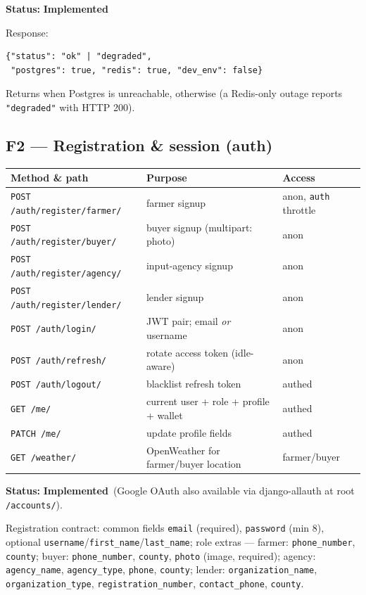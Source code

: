 \documentclass[11pt,a4paper]{article}
\newcommand{\done}{\textcolor{statusdone}{\textbf{Implemented}}}
\newcommand{\code}[1]{\texttt{\allowbreak #1\allowbreak}}
\begin{document}
\textbf{Status:} \done

Response:
\begin{verbatim}
{"status": "ok" | "degraded",
 "postgres": true, "redis": true, "dev_env": false}
\end{verbatim}
Returns \code{503} when Postgres is unreachable, \code{200} otherwise (a
Redis-only outage reports \code{"degraded"} with HTTP 200).

\subsection{F2 --- Registration \& session (auth)}
\begin{center}
\small
\begin{tabularx}{\textwidth}{@{} l X l @{}}
\toprule
\textbf{Method \& path} & \textbf{Purpose} & \textbf{Access} \\
\midrule
\code{POST /auth/register/farmer/}    & farmer signup  & anon, \code{auth} throttle \\
\code{POST /auth/register/buyer/}     & buyer signup (multipart: photo) & anon \\
\code{POST /auth/register/agency/}    & input-agency signup & anon \\
\code{POST /auth/register/lender/}    & lender signup  & anon \\
\code{POST /auth/login/}              & JWT pair; email \emph{or} username & anon \\
\code{POST /auth/refresh/}            & rotate access token (idle-aware) & anon \\
\code{POST /auth/logout/}             & blacklist refresh token & authed \\
\code{GET  /me/}                      & current user + role + profile + wallet & authed \\
\code{PATCH /me/}                     & update profile fields & authed \\
\code{GET  /weather/}                 & OpenWeather for farmer/buyer location & farmer/buyer \\
\bottomrule
\end{tabularx}
\end{center}

\textbf{Status:} \done\ (Google OAuth also available via django-allauth at
root \code{/accounts/}).

Registration contract: common fields \code{email} (required),
\code{password} (min 8), optional \code{username}/\code{first\_name}/\code{last\_name};
role extras --- farmer: \code{phone\_number}, \code{county};
buyer: \code{phone\_number}, \code{county}, \code{photo} (image, required);
agency: \code{agency\_name}, \code{agency\_type}, \code{phone}, \code{county};
lender: \code{organization\_name}, \code{organization\_type},
\code{registration\_number}, \code{contact\_phone}, \code{county}.
\end{document}
